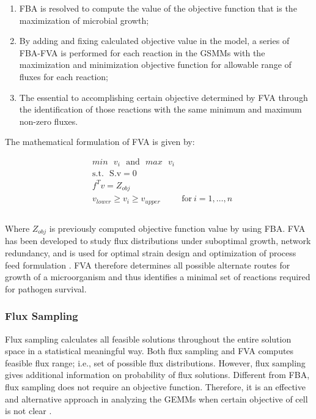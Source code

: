 \documentclass{article}
\begin{document}
\begin{enumerate}
\item FBA is resolved to compute the value of the objective function that is the maximization of microbial growth;
\item By adding and fixing calculated objective value in the model, a series of FBA-FVA is performed for each reaction in the GSMMs with the maximization and minimization objective function for allowable range of fluxes for each reaction;
\item The essential to accomplishing certain objective determined by FVA through the identification of those reactions with the same minimum and maximum non-zero fluxes.
\end{enumerate}

The mathematical formulation of FVA is given by:

\begin{equation}
\begin{aligned}
& min \text{ } v_i \text{ } \text{and} \text{ } max \text{ } v_i\\
& \mathrm{s.t.} \text{ } \text{S.v} = 0 \\
& f^{T}v = Z_{obj}\\
& v_{lower}\geq v_i\geq v_{upper} &\text{for}\ i = 1,\ldots,n\\\\
\end{aligned}
\end{equation}

Where $Z_{obj}$ is previously computed objective function value by using FBA. FVA has been developed to study flux distributions under suboptimal growth, network redundancy, and is used for optimal strain design and optimization of process feed formulation \cite{Tomar}. FVA therefore determines all possible alternate routes for growth of a microorganism and thus identifies a minimal set of reactions required for pathogen survival.

\subsubsection{Flux Sampling}

Flux sampling calculates all feasible solutions throughout the entire solution space in a statistical meaningful way. Both flux sampling and FVA computes feasible flux range; i.e., set of possible flux distributions. However, flux sampling gives additional information on probability of flux solutions. Different from FBA, flux sampling does not require an objective function. Therefore, it is an effective and alternative approach in analyzing the GEMMs when certain objective of cell is not clear \cite{Sertbas}.
\end{document}
